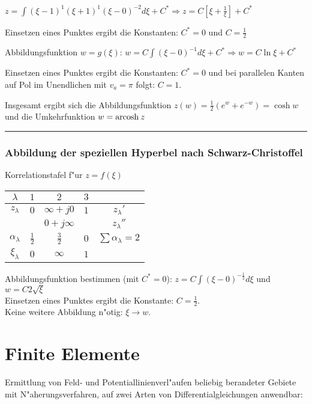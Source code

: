 $z=\int (\xi -1 )^1 (\xi + 1)^1 (\xi -0)^{-2} d\xi+C^{\ast}\Rightarrow
z=C\left[\xi+\frac{1}{\xi}\right]+C^{\ast}$

Einsetzen eines Punktes ergibt die Konstanten: $C^{\ast}=0$ und $C=\frac{1}{2}$

Abbildungsfunktion $w=g(\xi)$:
$w=C\int (\xi-0)^{-1} d\xi + C^{\ast} \Rightarrow
w= C\ln \xi + C^{\ast}$

Einsetzen eines Punktes ergibt die Konstanten:
$C^{\ast}=0$ und bei parallelen Kanten auf Pol im Unendlichen mit $v_a=\pi$
folgt: $C=1$.

Insgesamt ergibt sich die Abbildungsfunktion $z(w)= \frac{1}{2}(e^w+e^{-w})=
\cosh w$ und die Umkehrfunktion $w= {\rm arcosh}\: z$

\bigskip\hrule

\subsubsection{Abbildung der speziellen Hyperbel nach Schwarz-Christoffel}
Korrelationstafel f"ur $z=f(\xi)$
\begin{center}\begin{tabular}{c||c|c|c|c}
$\lambda$          & $1$ & $2$          & $3$             &  \\ \hline \hline
$z_{\lambda}$      & $0$ & $\infty +j0$ & $1$  & $z_{\lambda}'$ \\
                   &    & $0 +j\infty$&       & $z_{\lambda}''$\\ \hline
$\alpha_{\lambda}$ & $\frac{1}{2}$ & $\frac{3}{2}$ & $0$  & $\sum \alpha_{\lambda}=2$ \\ \hline
$\xi_{\lambda}$    & $0$ & $\infty$ & $1$  & \\
\end{tabular}\end{center}
Abbildungsfunktion bestimmen (mit $C^{\ast}=0$):
$z=C\int (\xi-0)^{-\frac{1}{2}} d\xi$ und
$w= C2\sqrt{\xi}$\\
Einsetzen eines Punktes ergibt die Konstante: $C=\frac{1}{2}$.\\
Keine weitere Abbildung n"otig: $\xi \rightarrow w$.

\clearpage \section{Finite Elemente}
Ermittlung von Feld- und Potentiallinienverl"aufen beliebig berandeter Gebiete
mit N"aherungsverfahren, auf zwei Arten von Differentialgleichungen anwendbar:

